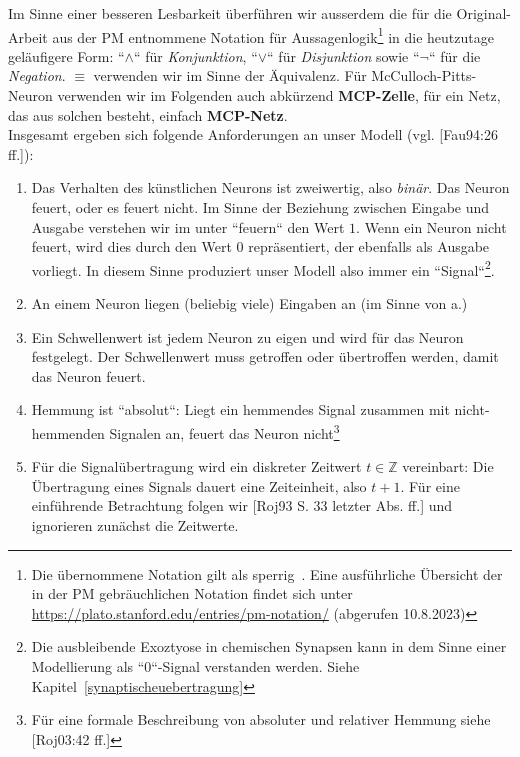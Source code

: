 Im Sinne einer besseren Lesbarkeit überführen wir ausserdem die für die Original-Arbeit aus der PM entnommene Notation für Aussagenlogik\footnote{
    Die übernommene Notation gilt als sperrig~\cite[16]{AR88}. Eine ausführliche Übersicht der in der PM gebräuchlichen Notation findet sich unter \url{https://plato.stanford.edu/entries/pm-notation/} (abgerufen 10.8.2023)
} in die heutzutage geläufigere Form: ``$\land$`` für \textit{Konjunktion}, ``$\lor$`` für \textit{Disjunktion} sowie ``$\neg$`` für die \textit{Negation}. $\equiv$ verwenden wir im Sinne der Äquivalenz.
Für McCulloch-Pitts-Neuron verwenden wir im Folgenden auch abkürzend \textbf{MCP-Zelle}, für ein Netz, das aus solchen besteht, einfach \textbf{MCP-Netz}.\\



Insgesamt ergeben sich folgende Anforderungen an unser Modell (vgl. [Fau94:26 ff.]):

\begin{enumerate}
    \item Das Verhalten des künstlichen Neurons ist zweiwertig, also \textit{binär}. Das Neuron feuert, oder es feuert nicht. Im Sinne der Beziehung zwischen Eingabe und Ausgabe verstehen wir im unter ``feuern`` den Wert $1$. Wenn ein Neuron nicht feuert, wird dies durch den Wert $0$ repräsentiert, der ebenfalls als Ausgabe vorliegt. In diesem Sinne produziert unser Modell also immer ein ``Signal``\footnote{
        Die ausbleibende Exoztyose in chemischen Synapsen kann in dem Sinne einer Modellierung als ``0``-Signal verstanden werden. Siehe Kapitel~\ref{synaptischeuebertragung}
    }.
    \item An einem Neuron liegen (beliebig viele) Eingaben an (im Sinne von a.)
    \item Ein Schwellenwert ist jedem Neuron zu eigen und wird für das Neuron festgelegt. Der Schwellenwert muss getroffen oder übertroffen werden, damit das Neuron feuert.
    \item Hemmung ist ``absolut``: Liegt ein hemmendes Signal zusammen mit nicht-hemmenden Signalen an, feuert das Neuron nicht\footnote{
        Für eine formale Beschreibung von absoluter und relativer Hemmung siehe [Roj03:42 ff.]
    }
    \item Für die Signalübertragung wird ein diskreter Zeitwert $t \in \mathbb{Z}$ vereinbart: Die Übertragung eines Signals dauert eine Zeiteinheit, also $t + 1$. Für eine einführende Betrachtung folgen wir [Roj93 S. 33 letzter Abs. ff.] und ignorieren zunächst die Zeitwerte.
\end{enumerate}


